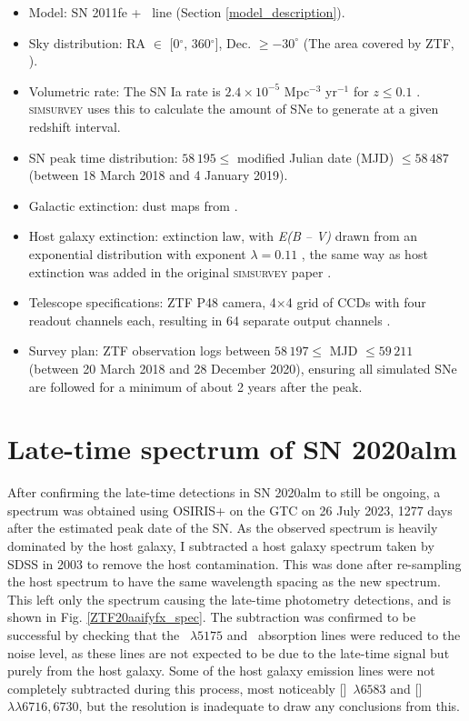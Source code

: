 \documentclass[a4paper,oneside,12pt, class=Latex/Classes/PhDthesisPSnPDF, crop=false]{standalone}
\begin{document}
\begin{itemize}
 \item Model: SN 2011fe + \Halpha~line (Section \ref{model_description}).
 \item Sky distribution: RA $\in$ [0$^{\circ}$, 360$^{\circ}$], Dec. $\geq -30^{\circ}$ (The area covered by ZTF, \citealt{ZTF_Surveys_Scheduler}).
 \item Volumetric rate: The SN Ia rate is $2.4\times10^{-5}$ Mpc$^{-3}$ yr$^{-1}$ for $z \leq 0.1$ \citep{SNIa_rate}. \textsc{simsurvey} uses this to calculate the amount of SNe to generate at a given redshift interval.
 \item SN peak time distribution: $58\,195 \leq$ modified Julian date (MJD) $\leq 58\,487$ (between 18 March 2018 and 4 January 2019).
 \item Galactic extinction: dust maps from \citet{SFD98_dust_maps}.
 \item Host galaxy extinction: \citet{ccm89_extinction_law} extinction law, with \textit{E(B -- V)} drawn from an exponential distribution with exponent $\lambda=0.11$ \citep{EBV_simsurvey}, the same way as host extinction was added in the original \textsc{simsurvey} paper \citep{simsurvey_main}.
 \item Telescope specifications: ZTF P48 camera, 4$\times$4 grid of CCDs with four readout channels each, resulting in 64 separate output channels \citep{ZTF_Observing_System}.
 \item Survey plan: ZTF observation logs between $58\,197\leq$ MJD $\leq 59\,211$ (between 20 March 2018 and 28 December 2020), ensuring all simulated SNe are followed for a minimum of about 2 years after the peak.
\end{itemize}


\section{Late-time spectrum of SN 2020alm}
\label{spec_sec}
After confirming the late-time detections in SN 2020alm to still be ongoing, a spectrum was obtained using OSIRIS+ on the GTC on 26 July 2023, 1277 days after the estimated peak date of the SN. As the observed spectrum is heavily dominated by the host galaxy, I subtracted a host galaxy spectrum taken by SDSS in 2003 to remove the host contamination. This was done after re-sampling the host spectrum to have the same wavelength spacing as the new spectrum. This left only the spectrum causing the late-time photometry detections, and is shown in Fig. \ref{ZTF20aaifyfx_spec}. The subtraction was confirmed to be successful by checking that the \MgI~${\lambda5175}$ and \NaID~absorption lines were reduced to the noise level, as these lines are not expected to be due to the late-time signal but purely from the host galaxy. Some of the host galaxy emission lines were not completely subtracted during this process, most noticeably [\NII]~${\lambda6583}$ and [\SII]~${\lambda\lambda6716,6730}$, but the resolution is inadequate to draw any conclusions from this.
\end{document}

